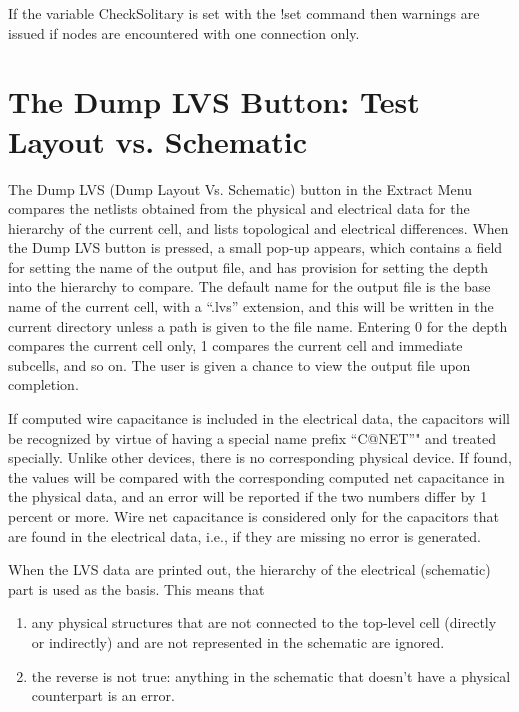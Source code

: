If the variable {\et CheckSolitary} is set with the {\cb !set} command
then warnings are issued if nodes are encountered with one connection
only.


\section{The {\cb Dump LVS} Button: Test Layout vs. Schematic}
\label{lvs}
The {\cb Dump LVS} (Dump Layout Vs.  Schematic) button in the {\cb
Extract Menu} compares the netlists obtained from the physical and
electrical data for the hierarchy of the current cell, and lists
topological and electrical differences.  When the {\cb Dump LVS}
button is pressed, a small pop-up appears, which contains a field for
setting the name of the output file, and has provision for setting the
depth into the hierarchy to compare.  The default name for the output
file is the base name of the current cell, with a ``{\vt .lvs}''
extension, and this will be written in the current directory unless a
path is given to the file name.  Entering 0 for the depth compares the
current cell only, 1 compares the current cell and immediate subcells,
and so on.  The user is given a chance to view the output file upon
completion.

If computed wire capacitance is included in the electrical data, the
capacitors will be recognized by virtue of having a special name
prefix ``{\vt C@NET}''" and treated specially.  Unlike other devices,
there is no corresponding physical device.  If found, the values will
be compared with the corresponding computed net capacitance in the
physical data, and an error will be reported if the two numbers differ
by 1 percent or more.  Wire net capacitance is considered only for the
capacitors that are found in the electrical data, i.e., if they are
missing no error is generated.

When the LVS data are printed out, the hierarchy of the
electrical (schematic) part is used as the basis.  This means that
\begin{enumerate}
\item{any physical structures that are not connected to the
top-level cell (directly or indirectly) and are not represented in
the schematic are ignored.}
\item{the reverse is not true: anything in the schematic that doesn't
have a physical counterpart is an error.}
\end{enumerate}

